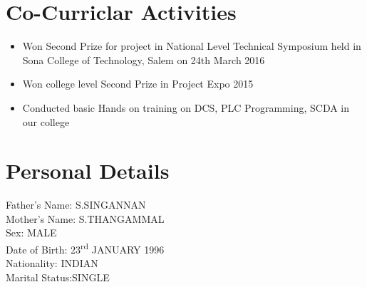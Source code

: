 \documentclass{My_CV_Class}
\begin{document}
\section{Co-Curriclar Activities}
\begin{itemize}
	\item Won Second Prize for project in National Level Technical Symposium held in Sona College of Technology, Salem on 24th March 2016
	\item Won college level Second Prize in Project Expo 2015
	\item Conducted basic Hands on training on DCS, PLC Programming, SCDA in our college
\end{itemize}
\section{Personal Details}
Father's Name: S.SINGANNAN \\
Mother's Name: S.THANGAMMAL\\
Sex:		   MALE\\
Date of Birth: 23\textsuperscript{rd} JANUARY 1996\\
Nationality:   INDIAN\\
Marital Status:SINGLE
\end{document}
